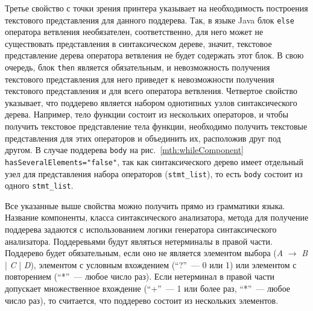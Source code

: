 Третье свойство с точки зрения принтера указывает на необходимость построения текстового представления для данного поддерева.
Так, в языке Java блок \lstinline{else} оператора ветвления необязателен, соответственно, для него может не существовать представления в синтаксическом дереве, значит, текстовое представление дерева оператора ветвления не будет содержать этот блок. 
В свою очередь, блок \lstinline{then} является обязательным, и невозможность получения текстового представления для него приведет к невозможности получения текстового представления и для всего оператора ветвления.
Четвертое свойство указывает, что поддерево является набором однотипных узлов синтаксического дерева.
Например, тело функции состоит из нескольких операторов, и чтобы получить текстовое представление тела функции, необходимо получить текстовые представления для этих операторов и объединить их, расположив друг под другом.
В случае поддерева \lstinline{body} на рис.~\ref{mth:whileComponent} \lstinline{hasSeveralElements="false"}, так как синтаксического дерево имеет отдельный узел для представления набора операторов (\lstinline{stmt_list}), то есть \lstinline{body} состоит из одного \lstinline{stmt_list}.

Все указанные выше свойства можно получить прямо из грамматики языка.
\noindent
Название компоненты, класса синтаксического анализатора, метода для получение поддерева задаются с использованием логики генератора синтаксического анализатора.
Поддеревьями будут являться нетерминалы в правой части. %
Поддерево будет обязательным, если оно не является элементом выбора (\emph{A} $\rightarrow$ \emph{B} | \emph{C} | \emph{D}), элементом с условным вхождением (``?''~--- 0 или 1) или элементом с повторением (``*''~--- любое число раз).
Если нетерминал в правой части допускает множественное вхождение (``+''~--- 1 или более раз, ``*''~--- любое число раз), то считается, что поддерево состоит из нескольких элементов.

